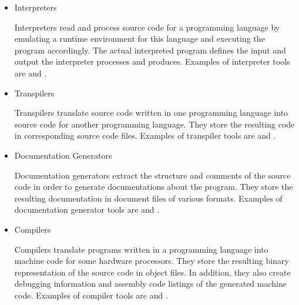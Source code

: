 \begin{itemize}

\item Interpreters\nopagebreak

Interpreters read and process source code for a programming language by emulating a runtime environment for this language and executing the program accordingly.
The actual interpreted program defines the input and output the interpreter processes and produces.
Examples of interpreter tools are  and .


\item Transpilers\nopagebreak

Transpilers translate source code written in one programming language into source code for another programming language.
They store the resulting code in corresponding source code files.
Examples of transpiler tools are  and .


\item Documentation Generators\nopagebreak

Documentation generators extract the structure and comments of the source code in order to generate documentations about the program.
They store the resulting documentation in document files of various formats. \seedocumentation
Examples of documentation generator tools are  and .


\item Compilers\nopagebreak

Compilers translate programs written in a programming language into machine code for some hardware processors.
They store the resulting binary representation of the source code in object files. \seeobject
In addition, they also create debugging information and assembly code listings of the generated machine code.
Examples of compiler tools are  and .


\end{itemize}
